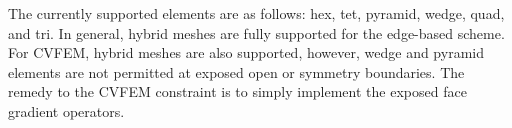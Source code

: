 The currently supported elements are as follows: hex, tet, pyramid, wedge, quad, and tri. 
In general, hybrid meshes are fully supported for the edge-based scheme. For CVFEM,
hybrid meshes are also supported, however, wedge and pyramid elements are not permitted
at exposed open or symmetry boundaries. The remedy to the CVFEM constraint is to
simply implement the exposed face gradient operators.
